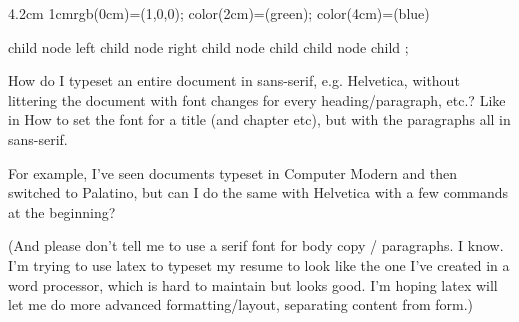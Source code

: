 \documentclass{article}
\begin{document}
\begin{sidebyside}[before lower app={\path[] (-2,-0.5) rectangle (2,0.5);}]{4.2cm}
  {1cm}{rgb(0cm)=(1,0,0); color(2cm)=(green); color(4cm)=(blue)}
\end{sidebyside}

\begin{sidebyside}{4.2cm}
  child {node {left}}
  child {node {right}
    child {node {child}}
    child {node {child}}
};
\end{sidebyside}

\begin{sidebyside}[explicitpicture]{4.2cm}
\end{sidebyside}

\newline
How do I typeset an entire document in sans-serif, e.g. Helvetica, without littering the document with font changes for every heading/paragraph, etc.? Like in How to set the font for a title (and chapter etc), but with the paragraphs all in sans-serif.

For example, I've seen documents typeset in Computer Modern and then switched to Palatino, but can I do the same with Helvetica with a few commands at the beginning?

(And please don't tell me to use a serif font for body copy / paragraphs. I know. I'm trying to use latex to typeset my resume to look like the one I've created in a word processor, which is hard to maintain but looks good. I'm hoping latex will let me do more advanced formatting/layout, separating content from form.)
\end{document}
